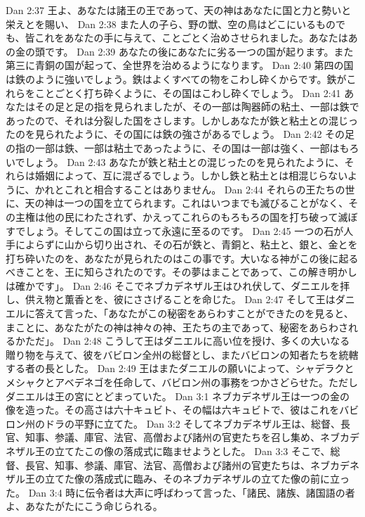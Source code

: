 Dan 2:37  王よ、あなたは諸王の王であって、天の神はあなたに国と力と勢いと栄えとを賜い、
Dan 2:38  また人の子ら、野の獣、空の鳥はどこにいるものでも、皆これをあなたの手に与えて、ことごとく治めさせられました。あなたはあの金の頭です。
Dan 2:39  あなたの後にあなたに劣る一つの国が起ります。また第三に青銅の国が起って、全世界を治めるようになります。
Dan 2:40  第四の国は鉄のように強いでしょう。鉄はよくすべての物をこわし砕くからです。鉄がこれらをことごとく打ち砕くように、その国はこわし砕くでしょう。
Dan 2:41  あなたはその足と足の指を見られましたが、その一部は陶器師の粘土、一部は鉄であったので、それは分裂した国をさします。しかしあなたが鉄と粘土との混じったのを見られたように、その国には鉄の強さがあるでしょう。
Dan 2:42  その足の指の一部は鉄、一部は粘土であったように、その国は一部は強く、一部はもろいでしょう。
Dan 2:43  あなたが鉄と粘土との混じったのを見られたように、それらは婚姻によって、互に混ざるでしょう。しかし鉄と粘土とは相混じらないように、かれとこれと相合することはありません。
Dan 2:44  それらの王たちの世に、天の神は一つの国を立てられます。これはいつまでも滅びることがなく、その主権は他の民にわたされず、かえってこれらのもろもろの国を打ち破って滅ぼすでしょう。そしてこの国は立って永遠に至るのです。
Dan 2:45  一つの石が人手によらずに山から切り出され、その石が鉄と、青銅と、粘土と、銀と、金とを打ち砕いたのを、あなたが見られたのはこの事です。大いなる神がこの後に起るべきことを、王に知らされたのです。その夢はまことであって、この解き明かしは確かです」。
Dan 2:46  そこでネブカデネザル王はひれ伏して、ダニエルを拝し、供え物と薫香とを、彼にささげることを命じた。
Dan 2:47  そして王はダニエルに答えて言った、「あなたがこの秘密をあらわすことができたのを見ると、まことに、あなたがたの神は神々の神、王たちの主であって、秘密をあらわされるかただ」。
Dan 2:48  こうして王はダニエルに高い位を授け、多くの大いなる贈り物を与えて、彼をバビロン全州の総督とし、またバビロンの知者たちを統轄する者の長とした。
Dan 2:49  王はまたダニエルの願いによって、シャデラクとメシャクとアベデネゴを任命して、バビロン州の事務をつかさどらせた。ただしダニエルは王の宮にとどまっていた。
Dan 3:1  ネブカデネザル王は一つの金の像を造った。その高さは六十キュビト、その幅は六キュビトで、彼はこれをバビロン州のドラの平野に立てた。
Dan 3:2  そしてネブカデネザル王は、総督、長官、知事、参議、庫官、法官、高僧および諸州の官吏たちを召し集め、ネブカデネザル王の立てたこの像の落成式に臨ませようとした。
Dan 3:3  そこで、総督、長官、知事、参議、庫官、法官、高僧および諸州の官吏たちは、ネブカデネザル王の立てた像の落成式に臨み、そのネブカデネザルの立てた像の前に立った。
Dan 3:4  時に伝令者は大声に呼ばわって言った、「諸民、諸族、諸国語の者よ、あなたがたにこう命じられる。

